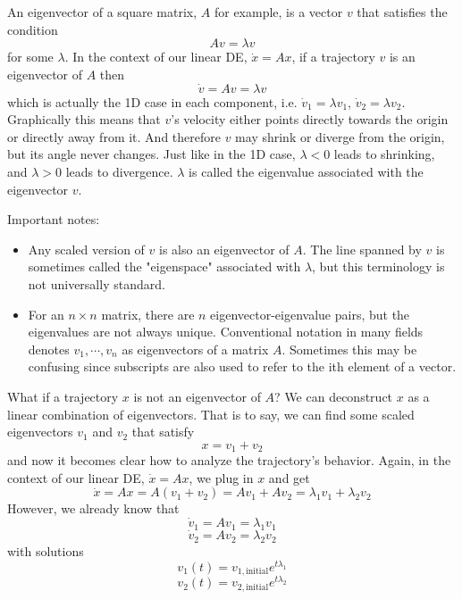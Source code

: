 \documentclass[11pt, oneside]{article}   	%
\begin{document}
An eigenvector of a square matrix, $A$ for example, is a vector $v$ that satisfies the condition
\begin{equation}
Av = \lambda v
\end{equation}
for some $\lambda$.
In the context of our linear DE, $\dot{x} = Ax$, if a trajectory $v$ is an eigenvector of $A$ then
\begin{equation}
\dot{v} = Av = \lambda v
\end{equation}
which is actually the 1D case in each component,
i.e. $\dot{v}_1 = \lambda v_1$, $\dot{v}_2 = \lambda v_2$.
Graphically this means that $v$'s velocity either points directly towards the origin or directly away from it.
And therefore $v$ may shrink or diverge from the origin, but its angle never changes.
Just like in the 1D case, $\lambda < 0$ leads to shrinking, and $\lambda > 0$ leads to divergence.
$\lambda$ is called the eigenvalue associated with the eigenvector $v$.

Important notes:
\begin{itemize}
\item Any scaled version of $v$ is also an eigenvector of $A$.
The line spanned by $v$ is sometimes called the "eigenspace" associated with $\lambda$, but this terminology is not universally standard.
\item For an $n\times n$ matrix, there are $n$ eigenvector-eigenvalue pairs, but the eigenvalues are not always unique.
Conventional notation in many fields denotes $ v_1,\cdots,v_n $ as eigenvectors of a matrix $A$.
Sometimes this may be confusing since subscripts are also used to refer to the ith element of a vector.
\end{itemize}

What if a trajectory $x$ is not an eigenvector of $A$?
We can deconstruct $x$ as a linear combination of eigenvectors.
That is to say, we can find some scaled eigenvectors $v_1$ and $v_2$ that satisfy
\begin{equation}
x = v_1 + v_2
\end{equation}
and now it becomes clear how to analyze the trajectory's behavior.
Again, in the context of our linear DE, $\dot{x} = Ax$, we plug in $x$ and get
\begin{equation}
\dot{x} = Ax
= A(v_1 + v_2)
= A v_1 + A v_2
= \lambda_1 v_1 + \lambda_2 v_2
\end{equation}
However, we already know that
$$ \dot{v}_1 = A v_1 = \lambda_1 v_1 $$
$$ \dot{v}_2 = A v_2 = \lambda_2 v_2 $$
with solutions
$$ v_1(t) = v_{1,\mathrm{initial}} e^{t\lambda_1} $$
$$ v_2(t) = v_{2,\mathrm{initial}} e^{t\lambda_2} $$
\end{document}
